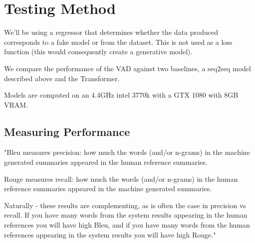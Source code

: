 \documentclass[12pt,twoside]{report}
\begin{document}
\section{Testing Method}

We'll be using a regressor that determines whether the data produced corresponds to a fake model or from the dataset. This is not used as a loss function (this would consequently create a generative model).

We compare the performance of the VAD against two baselines, a seq2seq model described above and the Transformer.

Models are computed on an 4.4GHz intel 3770k with a GTX 1080 with 8GB VRAM.


\subsection{Measuring Performance}

"Bleu measures precision: how much the words (and/or n-grams) in the machine generated summaries appeared in the human reference summaries.

Rouge measures recall: how much the words (and/or n-grams) in the human reference summaries appeared in the machine generated summaries.

Naturally - these results are complementing, as is often the case in precision vs recall. If you have many words from the system results appearing in the human references you will have high Bleu, and if you have many words from the human references appearing in the system results you will have high Rouge."








 
\end{document}
